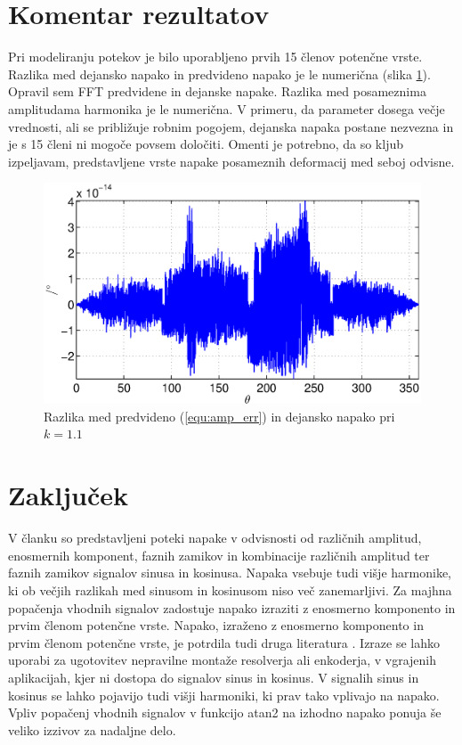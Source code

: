 \documentclass[a4paper]{article}
\begin{document}
\section{Komentar rezultatov}
Pri modeliranju potekov je bilo uporabljeno prvih 15 členov potenčne vrste. Razlika med dejansko napako in predvideno napako je le numerična (slika \ref{fig:razlika}). Opravil sem FFT predvidene in dejanske napake. Razlika med posameznima amplitudama harmonika je le numerična. V primeru, da parameter dosega večje vrednosti, ali se približuje robnim pogojem, dejanska napaka postane nezvezna in je s 15 členi ni mogoče povsem določiti. Omenti je potrebno, da so kljub izpeljavam, predstavljene vrste napake posameznih deformacij med seboj odvisne.
\begin{figure}[!htb]
	\begin{center}
		\includegraphics[width=\linewidth]{./Slike/razlika_amp.eps}
		\caption{Razlika med predvideno (\ref{equ:amp_err}) in dejansko napako pri $k=1.1$} \label{fig:razlika}
	\end{center}
\end{figure}




\section{Zaključek}

V članku so predstavljeni poteki napake v odvisnosti od različnih amplitud, enosmernih komponent, faznih zamikov in kombinacije različnih amplitud ter faznih zamikov signalov sinusa in kosinusa. Napaka vsebuje tudi višje harmonike, ki ob večjih razlikah med sinusom in kosinusom niso več zanemarljivi. Za majhna popačenja vhodnih signalov zadostuje napako izraziti z enosmerno komponento in prvim členom potenčne vrste. Napako, izraženo z enosmerno komponento in prvim členom potenčne vrste, je potrdila tudi druga literatura \cite{RLS1}. Izraze se lahko uporabi za ugotovitev nepravilne montaže resolverja ali enkoderja, v vgrajenih aplikacijah, kjer ni dostopa do signalov sinus in kosinus. V signalih sinus in kosinus se lahko pojavijo tudi višji harmoniki, ki prav tako vplivajo na napako. Vpliv popačenj vhodnih signalov v  funkcijo atan2 na izhodno napako ponuja še veliko izzivov za nadaljne delo.
\end{document}
